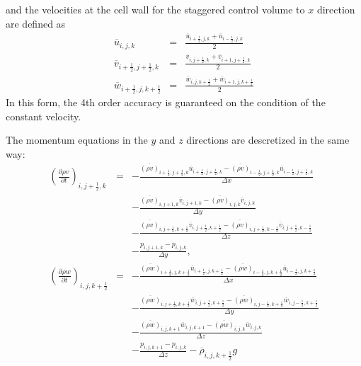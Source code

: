 and the velocities at the cell wall for the staggered control volume to $x$ direction are
defined as
\begin{eqnarray}
\overline{u}_{i,j,k} &=& \frac{\overline{u}_{i+\frac{1}{2},j,k}+\overline{u}_{i-\frac{1}{2},j,k}}{2}\\
\overline{v}_{i+\frac{1}{2},j+\frac{1}{2},k} &=& 
\frac{\overline{v}_{i,j+\frac{1}{2},k}+\overline{v}_{i+1,j+\frac{1}{2},k}}{2}\\
\overline{w}_{i+\frac{1}{2},j,k+\frac{1}{2}} &=& 
\frac{\overline{w}_{i,j,k+\frac{1}{2}}+\overline{w}_{i+1,j,k+\frac{1}{2}}}{2}
\end{eqnarray}
In this form, the 4th order accuracy is guaranteed 
on the condition of the constant velocity.

The momentum equations in the $y$ and $z$ directions are descretized 
in the same way:
\begin{eqnarray}
\left(\frac{\partial \rho v}{\partial t}\right)_{i,j+\frac{1}{2},k}
&=& - \frac{\overline{(\rho v)}_{i+\frac{1}{2},j+\frac{1}{2},k}  \overline{u}_{i+\frac{1}{2},j+\frac{1}{2},k} 
           -\overline{(\rho v)}_{i-\frac{1}{2},j+\frac{1}{2},k}  \overline{u}_{i-\frac{1}{2},j+\frac{1}{2},k}}
     {\Delta x}\nonumber\\
& & - \frac{\overline{(\rho v)}_{i,j+1,k} \overline{v}_{i,j+1,k} 
           -\overline{(\rho v)}_{i,j,k} \overline{v}_{i,j,k}}
     {\Delta y}\nonumber\\
& & - \frac{\overline{(\rho v)}_{i,j+\frac{1}{2},k+\frac{1}{2}}  \overline{v}_{i,j+\frac{1}{2},k+\frac{1}{2}} 
           -\overline{(\rho v)}_{i,j+\frac{1}{2},k-\frac{1}{2}}  \overline{v}_{i,j+\frac{1}{2},k-\frac{1}{2}}}
     {\Delta z}\nonumber\\
& & -\frac{p_{i,j+1,k}-p_{i,j,k}}{\Delta y},\\
\left(\frac{\partial \rho w}{\partial t}\right)_{i,j,k+\frac{1}{2}}
&=& - \frac{\overline{(\rho w)}_{i+\frac{1}{2},j,k+\frac{1}{2}}  \overline{u}_{i+\frac{1}{2},j,k+\frac{1}{2}} 
           -\overline{(\rho w)}_{i-\frac{1}{2},j,k+\frac{1}{2}}  \overline{u}_{i-\frac{1}{2},j,k+\frac{1}{2}}}
     {\Delta x}\nonumber\\
& & - \frac{\overline{(\rho w)}_{i,j+\frac{1}{2},k+\frac{1}{2}}  \overline{w}_{i,j+\frac{1}{2},k+\frac{1}{2}} 
           -\overline{(\rho w)}_{i,j-\frac{1}{2},k+\frac{1}{2}}  \overline{w}_{i,j-\frac{1}{2},k+\frac{1}{2}}}
     {\Delta y}\nonumber\\
& & - \frac{\overline{(\rho w)}_{i,j,k+1} \overline{w}_{i,j,k+1} 
           -\overline{(\rho w)}_{i,j,k} \overline{w}_{i,j,k}}
     {\Delta z}\nonumber\\
& & -\frac{p_{i,j,k+1}-p_{i,j,k}}{\Delta z}-\overline{\rho}_{i,j,k+\frac{1}{2}} g
\end{eqnarray}

